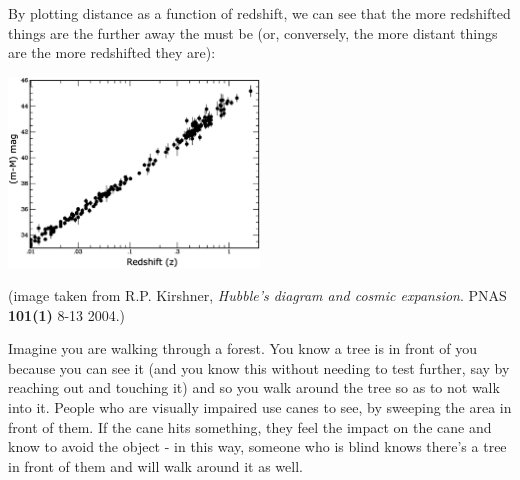 \documentclass[12pt]{exam}
\begin{document}
\begin{questions}
\begin{parts}
\begin{TheSolution}
	By plotting distance as a function of redshift, we can see that the more redshifted things are the further away the must be (or, conversely, the more distant things are the more redshifted they are):
	\begin{center}
	\includegraphics[width=0.5\textwidth]{../images/redshift.jpg}
	
	(image taken from R.P. Kirshner, \textit{Hubble's diagram and cosmic expansion}. PNAS \textbf{101(1)} 8-13 2004.)
	\end{center}
\end{TheSolution}
\end{parts}

\question Imagine you are walking through a forest. You know a tree is in front of you because you can see it (and you know this without needing to test further, say by reaching out and touching it) and so you walk around the tree so as to not walk into it. People who are visually impaired use canes to see, by sweeping the area in front of them. If the cane hits something, they feel the impact on the cane and know to avoid the object - in this way, someone who is blind knows there's a tree in front of them and will walk around it as well.


\end{questions}
\end{document}
